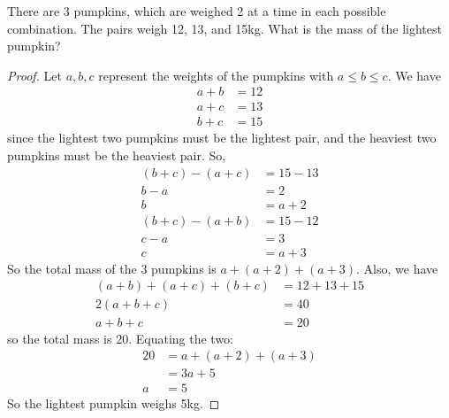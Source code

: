 \documentclass[12pt]{article}
\begin{document}
    \begin{myprob}{}{}
        There are 3 pumpkins, which are weighed 2 at a time in each possible combination. The pairs weigh 12, 13, and 15kg. What is the mass of the lightest pumpkin?
        
        \begin{proof}
            Let $a, b, c$ represent the weights of the pumpkins with $a\leq b\leq c$. We have
            \begin{align*}
                a+b&=12\\
                a+c&=13\\
                b+c&=15
            \end{align*}
            since the lightest two pumpkins must be the lightest pair, and the heaviest two pumpkins must be the heaviest pair. So,
            \begin{align*}
                (b+c)-(a+c)&=15-13\\
                b-a&=2\\
                b&=a+2\\
                (b+c)-(a+b)&=15-12\\
                c-a&=3\\
                c&=a+3
            \end{align*}
            So the total mass of the 3 pumpkins is $a+(a+2)+(a+3)$. Also, we have
            \begin{align*}
                (a+b)+(a+c)+(b+c)&=12+13+15\\
                2(a+b+c)&=40\\
                a+b+c&=20
            \end{align*}
            so the total mass is $20$. Equating the two:
            \begin{align*}
                20&=a+(a+2)+(a+3)\\
                &=3a+5\\
                a&=5
            \end{align*}
            So the lightest pumpkin weighs 5kg.
        \end{proof}
    \end{myprob}
\end{document}
